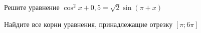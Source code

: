 \begin{ex}
	\begin{condition}
		\begin{enumcols}[label=\asbuk*)]
			\item Решите уравнение \( \cos^2 x +0,5 = \sqrt{2}\sin{(\pi + x)} \)
			\item Найдите все корни уравнения, принадлежащие отрезку \( \left[\pi;6\pi\right]  \)
		\end{enumcols}
	\end{condition}
\end{ex}